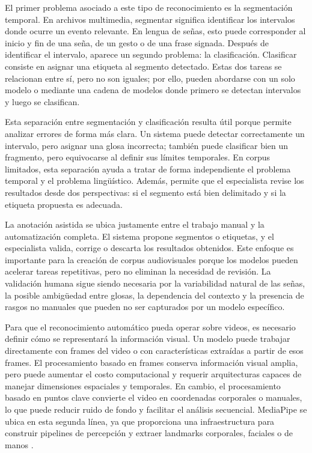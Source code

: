 El primer problema asociado a este tipo de reconocimiento es la segmentación temporal. En archivos multimedia, segmentar significa identificar los intervalos donde ocurre un evento relevante. En lengua de señas, esto puede corresponder al inicio y fin de una seña, de un gesto o de una frase signada. Después de identificar el intervalo, aparece un segundo problema: la clasificación. Clasificar consiste en asignar una etiqueta al segmento detectado. Estas dos tareas se relacionan entre sí, pero no son iguales; por ello, pueden abordarse con un solo modelo o mediante una cadena de modelos donde primero se detectan intervalos y luego se clasifican.

Esta separación entre segmentación y clasificación resulta útil porque permite analizar errores de forma más clara. Un sistema puede detectar correctamente un intervalo, pero asignar una glosa incorrecta; también puede clasificar bien un fragmento, pero equivocarse al definir sus límites temporales. En corpus limitados, esta separación ayuda a tratar de forma independiente el problema temporal y el problema lingüístico. Además, permite que el especialista revise los resultados desde dos perspectivas: si el segmento está bien delimitado y si la etiqueta propuesta es adecuada.

La anotación asistida se ubica justamente entre el trabajo manual y la automatización completa. El sistema propone segmentos o etiquetas, y el especialista valida, corrige o descarta los resultados obtenidos. Este enfoque es importante para la creación de corpus audiovisuales porque los modelos pueden acelerar tareas repetitivas, pero no eliminan la necesidad de revisión. La validación humana sigue siendo necesaria por la variabilidad natural de las señas, la posible ambigüedad entre glosas, la dependencia del contexto y la presencia de rasgos no manuales que pueden no ser capturados por un modelo específico.

Para que el reconocimiento automático pueda operar sobre videos, es necesario definir cómo se representará la información visual. Un modelo puede trabajar directamente con frames del video o con características extraídas a partir de esos frames. El procesamiento basado en frames conserva información visual amplia, pero puede aumentar el costo computacional y requerir arquitecturas capaces de manejar dimensiones espaciales y temporales. En cambio, el procesamiento basado en puntos clave convierte el video en coordenadas corporales o manuales, lo que puede reducir ruido de fondo y facilitar el análisis secuencial. MediaPipe se ubica en esta segunda línea, ya que proporciona una infraestructura para construir pipelines de percepción y extraer landmarks corporales, faciales o de manos \cite{lugaresi2019mediapipe}.

